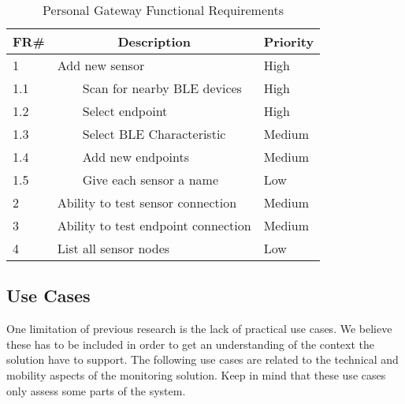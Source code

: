 \begin{table}[]
\centering
\caption{Personal Gateway Functional Requirements}
\label{tab:gatewayRequirements}
\begin{tabular}{|l|l|l|}
\hline
\textbf{FR\#} & \multicolumn{1}{c|}{\textbf{Description}} & \multicolumn{1}{c|}{\textbf{Priority}} \\ \hline
1             & Add new sensor                            & High                                   \\ \hline
1.1           & \ \ \ \ Scan for nearby BLE devices               & High                                   \\ \hline
1.2           & \ \ \ \ Select endpoint                           & High                                   \\ \hline
1.3           & \ \ \ \ Select BLE Characteristic                 & Medium                                 \\ \hline
1.4           & \ \ \ \ Add new endpoints                         & Medium                                 \\ \hline
1.5           & \ \ \ \ Give each sensor a name                   & Low                                    \\ \hline
2             & Ability to test sensor connection         & Medium                                 \\ \hline
3             & Ability  to test endpoint connection      & Medium                                 \\ \hline
4             & List all sensor nodes                     & Low                                    \\ \hline
\end{tabular}
\end{table}


\subsection{Use Cases} %
\label{ssub:use_cases}

One limitation of previous research is the lack of practical use cases. We believe these has to be included in order to get an understanding of the context the solution have to support. The following use cases are related to the technical and mobility aspects of the monitoring solution. Keep in mind that these use cases only assess some parts of the system.

